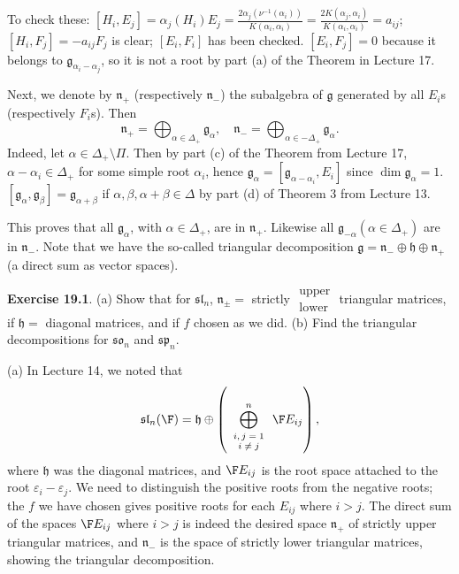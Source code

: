 \documentclass[11pt]{article}
\newcommand{\sll}{\mathfrak{sl}}
\newcommand{\so}{\mathfrak{so}}
\newcommand{\spp}{\mathfrak{sp}}
\newcommand{\g}{\mathfrak{g}}
\newcommand{\h}{\mathfrak{h}}
\newcommand{\n}{\mathfrak{n}}
\newcommand{\sk}{\vspace*{1em}}
\begin{document}
To check these: $[H_i, E_j] = \alpha_j(H_i) E_j = \frac{2 \alpha_j (\nu^{-1}(\alpha_i))}{K(\alpha_i, \alpha_i)} = \frac{2K(\alpha_j, \alpha_i)}{K(\alpha_i, \alpha_i)} = a_{ij}$; $[H_i, F_j] = -a_{ij} F_j$ is clear; $[E_i, F_i]$ has been
checked.  $[E_i, F_j] = 0$ because it belongs to $\g_{\alpha_i - \alpha_j}$,
so it is not a root by part (a) of the Theorem in Lecture 17.

Next, we denote by $\n_+$ (respectively $\n_-$) the subalgebra of
$\g$ generated by all $E_i$s (respectively $F_i$s).  Then
\[ \n_+ = \bigoplus_{\alpha \in \Delta_+} \g_\alpha, \quad
   \n_- = \bigoplus_{\alpha \in -\Delta_+} \g_\alpha. \]
Indeed, let $\alpha \in \Delta_+ \setminus \Pi$.  Then
by part (c) of the Theorem from Lecture 17, $\alpha - \alpha_i 
\in \Delta_+$ for some simple root $\alpha_i$, hence $\g_\alpha =
[\g_{\alpha - \alpha_i}, E_i]$ since $\dim \g_{\alpha} = 1$.
$[\g_\alpha, \g_\beta] = \g_{\alpha+\beta}$ if $\alpha, \beta,
\alpha+\beta \in \Delta$ by part (d) of Theorem 3 from Lecture 13.

This proves that all $\g_\alpha$, with $\alpha \in \Delta_+$, are in
$\n_+$.  Likewise all $\g_{-\alpha} (\alpha \in \Delta_+)$ are in
$\n_-$.  Note that we have the so-called triangular decomposition
$\g = \n_- \oplus \h \oplus \n_+$ (a direct sum as vector spaces).

\sk\noindent
{\bf Exercise 19.1}. (a) Show that for $\sll_n$, $\n_{\pm} = $ 
strictly {\scriptsize $\begin{array}{c}\mbox{upper} \\ \mbox{lower}\end{array}$}
triangular matrices, if $\h = $ diagonal matrices, and if $f$ chosen
as we did.  (b) Find the triangular decompositions for $\so_n$ and
$\spp_n$.

\sk{} (a) In Lecture 14, we noted that 
\[ \sll_n(\F) = \h \oplus \left(\bigoplus_{\mbox{\scriptsize
    $\begin{array}{c}i,j=1\\i \neq j\end{array}$}}^n \F E_{ij}\right), \]
where $\h$ was the diagonal matrices, and $\F E_{ij}$ is the root
space attached to the root $\varepsilon_i - \varepsilon_j$.  We need
to distinguish the positive roots from the negative roots; the $f$ we
have chosen gives positive roots for each $E_{ij}$ where $i > j$. The
direct sum of the spaces $\F E_{ij}$ where $i > j$ is indeed the
desired space $\n_+$ of strictly upper triangular matrices, and $\n_-$
is the space of strictly lower triangular matrices, showing the triangular
decomposition.
\end{document}
